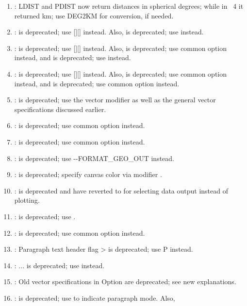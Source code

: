 \begin{enumerate}
	\item {}: LDIST and PDIST now return distances in spherical degrees; while in \gmt\ 4 it returned km; use DEG2KM for conversion, if needed.
	\item {}:  is deprecated; use [][] instead.
		Also,  is deprecated; use  instead.
	\item {}:  is deprecated; use [][] instead.
		Also,  is deprecated; use common option  instead, and  is deprecated; use  instead.
	\item {}:  is deprecated; use [][] instead.
		Also,  is deprecated; use common option  instead, and  is deprecated; use common option  instead.
	\item {}:  is deprecated; use the vector modifier  as well as the general vector specifications discussed earlier.
	\item {}:  is deprecated; use common option  instead.
	\item {}:  is deprecated; use common option  instead.
	\item {}:  is deprecated; use {-}{-}FORMAT\_GEO\_OUT instead.
	\item {}:  is deprecated; specify canvas color via  modifier .
	\item {}:  is deprecated and have reverted to  for selecting data output instead of plotting.
	\item {}:  is deprecated; use .
	\item {}:  is deprecated; use common option  instead.
	\item {}: Paragraph text header flag > is deprecated; use P instead.
	\item {}: ... is deprecated; use  instead.
	\item {}: Old vector specifications in Option  are deprecated; see new explanations.
	\item {}:  is deprecated; use  to indicate paragraph mode.  Also,

\end{enumerate}

